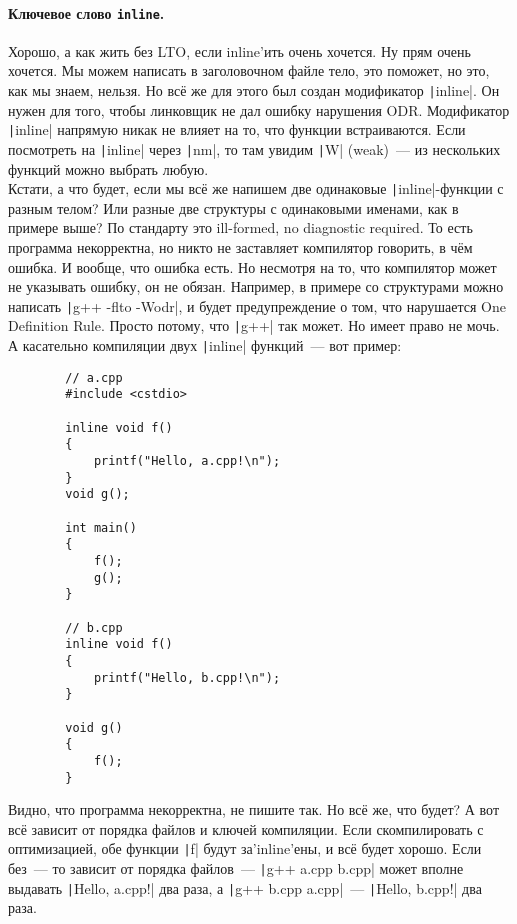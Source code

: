 \documentclass{article}
\begin{document}
    \paragraph{Ключевое слово \texttt{inline}.}
    Хорошо, а как жить без LTO, если inline'ить очень хочется. Ну прям очень хочется. Мы можем написать в заголовочном файле тело, это поможет, но это, как мы знаем, нельзя. Но всё же для этого был создан модификатор \texttt|inline|. Он нужен для того, чтобы линковщик не дал ошибку нарушения ODR. Модификатор \texttt|inline| напрямую никак не влияет на то, что функции встраиваются. Если посмотреть на \texttt|inline| через \texttt|nm|, то там увидим \texttt|W| (weak)~--- из нескольких функций можно выбрать любую.\\
    Кстати, а что будет, если мы всё же напишем две одинаковые \texttt|inline|-функции с разным телом? Или разные две структуры с одинаковыми именами, как в примере выше? По стандарту это ill-formed, no diagnostic required. То есть программа некорректна, но никто не заставляет компилятор говорить, в чём ошибка. И вообще, что ошибка есть. Но несмотря на то, что компилятор может не указывать ошибку, он не обязан. Например, в примере со структурами можно написать \texttt|g++ -flto -Wodr|, и будет предупреждение о том, что нарушается One Definition Rule. Просто потому, что \texttt|g++| так может. Но имеет право не мочь. А касательно компиляции двух \texttt|inline| функций~--- вот пример:
    \begin{verbatim}
        // a.cpp
        #include <cstdio>

        inline void f()
        {
            printf("Hello, a.cpp!\n");
        }
        void g();

        int main()
        {
            f();
            g();
        }

        // b.cpp
        inline void f()
        {
            printf("Hello, b.cpp!\n");
        }

        void g()
        {
            f();
        }
    \end{verbatim}
    Видно, что программа некорректна, не пишите так. Но всё же, что будет? А вот всё зависит от порядка файлов и ключей компиляции. Если скомпилировать с оптимизацией, обе функции \texttt|f| будут за'inline'ены, и всё будет хорошо. Если без~--- то зависит от порядка файлов~--- \texttt|g++ a.cpp b.cpp| может вполне выдавать \texttt|Hello, a.cpp!| два раза, а \texttt|g++ b.cpp a.cpp|~--- \texttt|Hello, b.cpp!| два раза.
\end{document}
